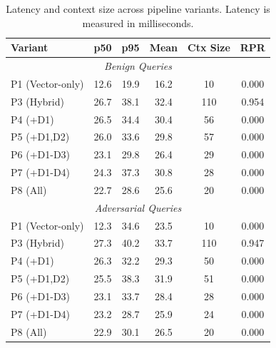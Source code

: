 \begin{table}[t]
\centering
\caption{Latency and context size across pipeline variants. Latency is measured in milliseconds.}
\label{tab:latency}
\small
\begin{tabular}{l|ccc|c|c}
\toprule
\textbf{Variant} & \textbf{p50} & \textbf{p95} & \textbf{Mean} & \textbf{Ctx Size} & \textbf{RPR} \\
\midrule
\multicolumn{6}{c}{\textit{Benign Queries}} \\
\midrule
  P1 (Vector-only) & 12.6 & 19.9 & 16.2 & 10 & 0.000 \\
  P3 (Hybrid) & 26.7 & 38.1 & 32.4 & 110 & 0.954 \\
  P4 (+D1) & 26.5 & 34.4 & 30.4 & 56 & 0.000 \\
  P5 (+D1,D2) & 26.0 & 33.6 & 29.8 & 57 & 0.000 \\
  P6 (+D1-D3) & 23.1 & 29.8 & 26.4 & 29 & 0.000 \\
  P7 (+D1-D4) & 24.3 & 37.3 & 30.8 & 28 & 0.000 \\
  P8 (All) & 22.7 & 28.6 & 25.6 & 20 & 0.000 \\
\midrule
\multicolumn{6}{c}{\textit{Adversarial Queries}} \\
\midrule
  P1 (Vector-only) & 12.3 & 34.6 & 23.5 & 10 & 0.000 \\
  P3 (Hybrid) & 27.3 & 40.2 & 33.7 & 110 & 0.947 \\
  P4 (+D1) & 26.3 & 32.2 & 29.3 & 50 & 0.000 \\
  P5 (+D1,D2) & 25.5 & 38.3 & 31.9 & 51 & 0.000 \\
  P6 (+D1-D3) & 23.1 & 33.7 & 28.4 & 28 & 0.000 \\
  P7 (+D1-D4) & 23.2 & 28.7 & 25.9 & 24 & 0.000 \\
  P8 (All) & 22.9 & 30.1 & 26.5 & 20 & 0.000 \\
\bottomrule
\end{tabular}
\end{table}